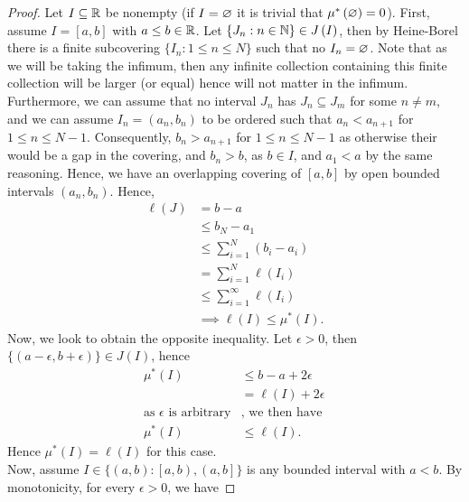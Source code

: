 \begin{proof}
	Let \(I\subseteq \mathbb{R}\) be nonempty (if \(I = \varnothing\) it is trivial that \( \mu^{*}\left( \varnothing \right) = 0\)). First, assume \(I = \left[ a, b \right] \)  with \(a\le b \in \mathbb{R}\). Let \(\{J_{n} : n \in \mathbb{N}\} \in J\left( I \right) \), then by Heine-Borel there is a finite subcovering \(\{I_{n} : 1\le n \le N\} \) such that no \(I_{n} = \varnothing\). Note that as we will be taking the infimum, then any infinite collection containing this finite collection will be larger (or equal) hence will not matter in the infimum. Furthermore, we can assume that no interval \(J_{n}\) has \(J_{n} \subseteq J_{m}\) for some \(n \neq m\), and we can assume \(I_{n} = \left( a_{n}, b_{n} \right) \) to be ordered such that \(a_{n} < a_{n+1}\) for \(1\le n \le N-1\). Consequently, \(b_{n} > a_{n + 1}\) for \(1 \le n \le N-1\) as otherwise their would be a gap in the covering, and \(b_{n} > b\), as \(b \in I\), and \(a_1 < a\) by the same reasoning. Hence, we have an overlapping covering of \(\left[ a, b \right] \) by open bounded intervals \(\left( a_{n}, b_{n} \right) \). Hence,
	\begin{align*}
		\ell\left( J \right) &=  b-a \\
				     &\le b_{N}- a_1\\
				     &\le \sum_{i= 1}^{N} \left( b_{i} - a_{i} \right) \\
				     &= \sum_{i= 1}^{N} \ell\left( I_{i} \right)  \\
				     &\le \sum_{i= 1}^{\infty} \ell\left( I_{i} \right)\\
				     &\implies \ell\left( I \right)  \le \mu^{*}\left( I \right)
	.\end{align*}
	Now, we look to obtain the opposite inequality. Let \(\epsilon > 0\), then \(\{\left( a - \epsilon, b + \epsilon \right) \} \in J\left( I \right)  \), hence
	\begin{align*}
		\mu^{*} \left( I \right)  &\le b - a + 2\epsilon\\
		&= \ell\left( I \right)  + 2\epsilon\\
	\text{as \(\epsilon\) is arbitrary} &\text{, we then have }\\
		\mu^{*}\left( I \right) &\le \ell\left( I \right)
	.\end{align*}
	Hence \( \mu^{*} \left( I \right)  = \ell\left( I \right) \) for this case.\\
	Now, assume \(I \in \{\left( a, b \right) : \left[ a, b \right), \left( a, b \right]  \} \) is any bounded interval with \(a < b\). By monotonicity, for every \(\epsilon > 0\), we have

\end{proof}
